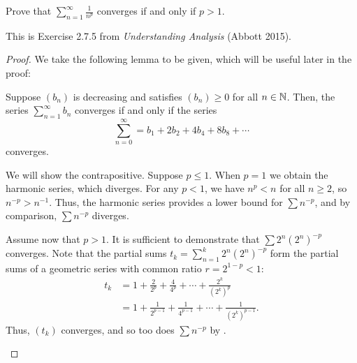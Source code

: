 \begin{problem}
  Prove that $\displaystyle \sum_{n=1}^{\infty} \frac{1}{n^{p}}$ converges if and only if $p > 1$.

  \leavevmode\par\noindent

  \begin{callout}
    This is Exercise 2.7.5 from \textit{Understanding Analysis} (Abbott 2015).
  \end{callout}

  \begin{proof}

    We take the following lemma to be given, which will be useful later in the proof:
    \begin{lemma}
      \label{lem:2.4.6}
      Suppose $(b_{n})$ is decreasing and satisfies $(b_{n}) \geq 0$ for all $n \in \mathbb{N}$. Then, the series
      $\sum_{n=1}^{\infty} b_{n}$ converges if and only if the series
      \[
        \sum_{n=0}^{\infty} = b_{1} + 2b_{2} + 4b_{4} + 8b_{8} + \cdots
      \]
      converges.
    \end{lemma}

    \begin{forwardimplication}
      We will show the contrapositive. Suppose $p \le 1$.
      When $p = 1$ we obtain the harmonic series, which diverges.
      For any $p < 1$, we have $n^{p} < n$ for all $n \ge 2$, so $n^{-p} > n^{-1}$.
      Thus, the harmonic series provides a lower bound for $\sum n^{-p}$, and by
      comparison, $\sum n^{-p}$ diverges.
    \end{forwardimplication}

    \vspace{\baselineskip}
  
    \begin{backwardimplication}
      Assume now that $p > 1$. It is sufficient to  demonstrate that $\sum 2^{n}(2^{n})^{-p}$
      converges. Note that the partial sums $t_{k} = \sum_{n=1}^{k} 2^{n}(2^{n})^{-p}$
      form the partial sums of a geometric series with common ratio $r = 2^{1-p} < 1$:
      \begin{align*}
        t_{k} &= 1 + \frac{2}{2^{p}} + \frac{4}{4^{p}} + \cdots + \frac{2^{k}}{(2^{k})^{p}}\\
              &= 1 + \frac{1}{2^{p-1}} + \frac{1}{4^{p-1}} + \cdots + \frac{1}{(2^{k})^{p-1}}.
      \end{align*}
      Thus, $(t_{k})$ converges, and so too does $\sum n^{-p}$ by .
    \end{backwardimplication}
  \end{proof}
\end{problem}
